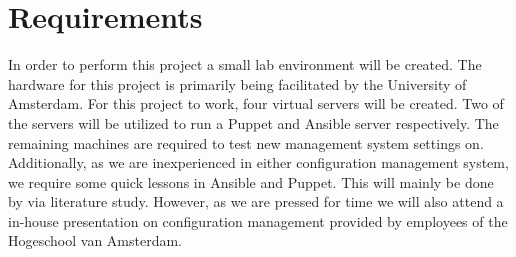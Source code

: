 \section{Requirements}\label{sec:requirements}
In order to perform this project a small lab environment will be created. The hardware for this project is primarily being facilitated by the University of Amsterdam. For this project to work, four virtual servers will be created. Two of the servers will be utilized to run a Puppet and Ansible server respectively. The remaining machines are required to test new management system settings on. Additionally, as we are inexperienced in either configuration management system, we require some quick lessons in Ansible and Puppet. This will mainly be done by via literature study. However, as we are pressed for time we will also attend a in-house presentation on configuration management provided by employees of the Hogeschool van Amsterdam.
